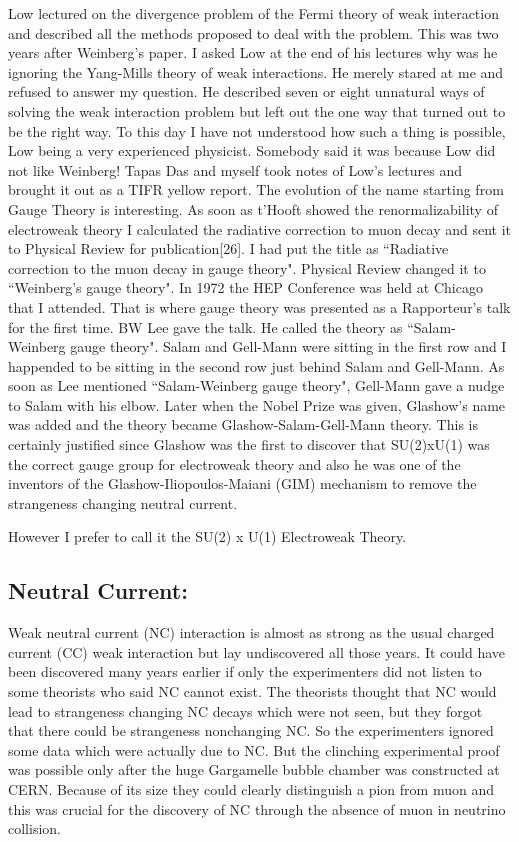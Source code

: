 Low lectured on the divergence problem of the Fermi theory of weak 
interaction and described all the methods proposed to deal with the 
problem. This was two years after Weinberg's paper. I asked Low at the 
end of his lectures why was he ignoring the Yang-Mills theory of weak 
interactions. He merely stared at me and refused to answer my question. 
He described seven or eight unnatural ways of solving the weak 
interaction pro\-blem but left out the one way that turned out to be the 
right way. To this day I have not understood how such a thing is 
possible, Low being a very experienced physicist. Somebody said it was 
because Low did not like Weinberg! Tapas Das and myself took notes of 
Low's lectures and brought it out as a TIFR yellow report.
\vskip 1pt
The evolution of the name starting from Gauge Theory is inte\-resting. As 
soon as t'Hooft showed the renormalizability of electroweak theory I 
calculated the radiative correction to muon decay and sent it to 
Physical Review for publication[26]. I had put the title as ``Radiative 
correction to the muon decay in gauge theory". Physical Review changed 
it to ``Weinberg's gauge theory". In 1972 the HEP Conference was held at 
Chicago that I atten\-ded. That is where gauge theory was presented as a 
Rappor\-teur's talk for the first time. BW Lee gave the talk. He called 
the theory as ``Salam-Weinberg gauge theory". Salam and Gell-Mann were 
sitting in the first row and I happended to be sitting in the second row 
just behind Salam and Gell-Mann. As soon as Lee mentioned 
``Salam-Weinberg gauge theory", Gell-Mann gave a nudge to Salam with his 
elbow. Later when the Nobel Prize was given, Glashow's name was added 
and the theory became Glashow-Salam-Gell-Mann theory. This is certainly 
justi\-fied since Glashow was the first to discover that SU(2)xU(1) was 
the correct gauge group for electroweak theory and also he was one of 
the inventors of the Glashow-Iliopoulos-Maiani (GIM) mechanism to remove 
the strangeness changing neutral current.

However I prefer to call it the SU(2) x U(1) Electroweak Theory.


\vspace{-.3cm}

\subsection*{Neutral Current:}

Weak neutral current (NC) interaction is almost as strong as the usual 
charged current (CC) weak interaction but lay undisco\-vered all those 
years. It could have been discovered many years earlier if only the 
experimenters did not listen to some theorists who said NC cannot exist. 
The theorists thought that NC would lead to strangeness changing NC 
decays which were not seen, but they for\-got that there could be 
strangeness nonchanging NC. So the experi\-menters ignored some data which 
were actually due to NC. But the clinching experimental proof was 
possible only after the huge Gargamelle bubble chamber was constructed 
at CERN. Becau\-se of its size they could clearly distinguish a pion from 
muon and this was crucial for the discovery of NC through the absence of 
muon in neutrino collision.

